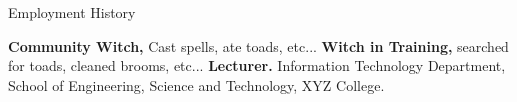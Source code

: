 \begin{rubric}{Employment History}

\entry*[2014 -- ]%
	\textbf{Community Witch,} Cast spells, ate toads, etc...
\entry*[2012 -- 2014]%
	\textbf{Witch in Training,} searched for toads, cleaned brooms, etc...
%
%
\entry*[2013 -- 2015]%
	\textbf{Lecturer.} Information Technology Department, School of Engineering, Science and Technology, XYZ College.
%
\end{rubric}